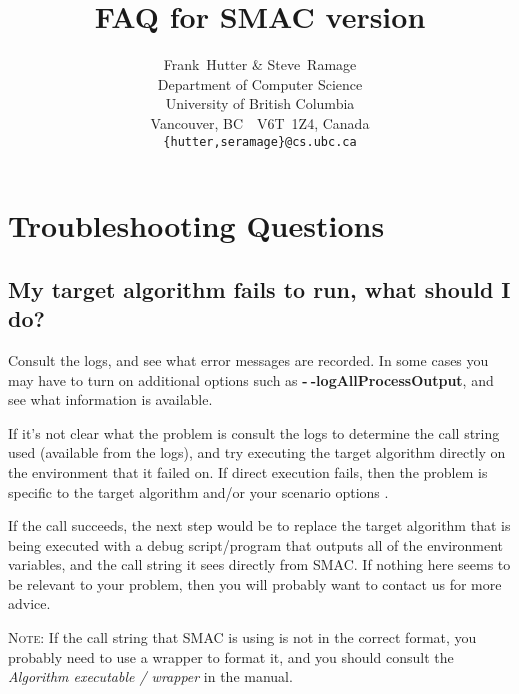 \documentclass[11pt,letterpaper,oneside]{article}
\begin{document}
\title{FAQ for SMAC version }

\author{
Frank~Hutter \& Steve~Ramage\\
Department of Computer Science\\
University of British Columbia\\
Vancouver, BC\ \ V6T~1Z4, Canada\\
\texttt{\{hutter,seramage\}@cs.ubc.ca}
}



\maketitle


\renewcommand*\contentsname{FAQ}
\tableofcontents

\section{Troubleshooting Questions}



\subsection{My target algorithm fails to run, what should I do?}

Consult the logs, and see what error messages are recorded. In some cases you may have to turn on additional options such as \textbf{-$~\!$-logAllProcessOutput}, and see what information is available.

If it's not clear what the problem is consult the logs to determine the call string used (available from the logs), and try executing the target algorithm directly on the environment that it failed on. If direct execution fails, then the problem is specific to the target algorithm and/or your scenario options . 

If the call succeeds, the next step would be to replace the target algorithm that is being executed with a debug script/program that outputs all of the environment variables, and the call string it sees directly from SMAC. If nothing here seems to be relevant to your problem, then you will probably want to contact us for more advice.

\textsc{Note:} If the call string that SMAC is using is not in the correct format, you probably need to use a wrapper to format it, and you should consult the \emph{Algorithm executable / wrapper} in the manual.
\end{document}
